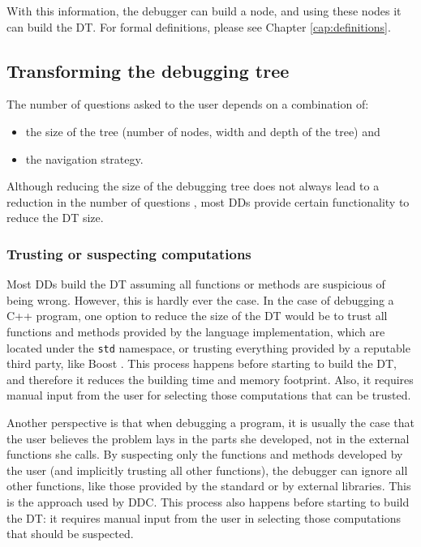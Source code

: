 With this information, the debugger can build a node, and using these nodes it can build the DT.
%
For formal definitions, please see Chapter \ref{cap:definitions}.

\subsection{Transforming the debugging tree}

The number of questions asked to the user depends on a combination of:
\begin{itemize}
    \item the size of the tree (number of nodes, width and depth of the tree) and
    \item the navigation strategy.
\end{itemize}

Although reducing the size of the debugging tree does not always lead to a reduction in the number of questions \cite{LoopExpansionTreeCompression}, most DDs provide certain functionality to reduce the DT size.

\subsubsection{Trusting or suspecting computations}

Most DDs build the DT assuming all functions or methods are suspicious of being wrong.
However, this is hardly ever the case.
%
In the case of debugging a C++ program, one option to reduce the size of the DT would be to trust all functions and methods provided by the language implementation, which are located under the \verb|std| namespace, or trusting everything provided by a reputable third party, like Boost \cite{TheBoostLibraries}.
This process happens before starting to build the DT, and therefore it reduces the building time and memory footprint. Also, it requires manual input from the user for selecting those computations that can be trusted.

Another perspective is that when debugging a program, it is usually the case that the user believes the problem lays in the parts she developed, not in the external functions she calls.
%
By suspecting only the functions and methods developed by the user (and implicitly trusting all other functions), the debugger can ignore all other functions, like those provided by the standard or by external libraries.
This is the approach used by DDC.
This process also happens before starting to build the DT: it requires manual input from the user in selecting those computations that should be suspected.

